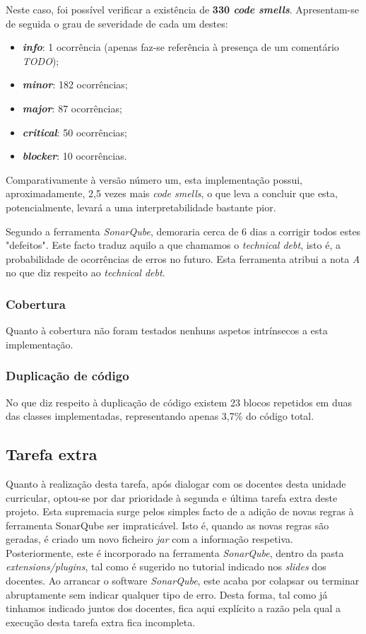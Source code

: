 \documentclass[a4paper]{report}
\begin{document}
Neste caso, foi possível verificar a existência de \textbf{330 \textit{code smells}}. Apresentam-se de seguida o grau de severidade de cada um destes:
\begin{itemize}
    \item \textbf{\textit{info}}: 1 ocorrência (apenas faz-se referência à presença de um comentário \textit{TODO});
    \item \textbf{\textit{minor}}: 182 ocorrências;
    \item \textbf{\textit{major}}: 87 ocorrências;
    \item \textbf{\textit{critical}}: 50 ocorrências;
    \item \textbf{\textit{blocker}}: 10 ocorrências.
\end{itemize}

Comparativamente à versão número um, esta implementação possui, aproximadamente, 2,5 vezes mais \textit{code smells}, o que leva a concluir que esta, potencialmente, levará a uma interpretabilidade bastante pior.

Segundo a ferramenta \textit{SonarQube}, demoraria cerca de 6 dias a corrigir todos estes "defeitos". Este facto traduz aquilo a que chamamos o \textit{technical debt}, isto é, a probabilidade de ocorrências de erros no futuro. Esta ferramenta atribui a nota \textit{A} no que diz respeito ao \textit{technical debt}.

\subsubsection{Cobertura}
Quanto à cobertura não foram testados nenhuns aspetos intrínsecos a esta implementação.

\subsubsection{Duplicação de código}
No que diz respeito à duplicação de código existem 23 blocos repetidos em duas das classes implementadas, representando apenas 3,7\% do código total.

\subsection{Tarefa extra}
Quanto à realização desta tarefa, após dialogar com os docentes desta unidade curricular, optou-se por dar prioridade à segunda e última tarefa extra deste projeto. 
Esta supremacia surge pelos simples facto de a adição de novas regras à ferramenta SonarQube ser impraticável. Isto é, quando as novas regras são geradas, é criado um novo ficheiro \textit{jar} com a informação respetiva. Posteriormente, este é incorporado na ferramenta \textit{SonarQube}, dentro da pasta \textit{extensions/plugins}, tal como é sugerido no tutorial indicado nos \textit{slides} dos docentes.
Ao arrancar o software \textit{SonarQube}, este acaba por colapsar ou terminar abruptamente sem indicar qualquer tipo de erro. Desta forma, tal como já tinhamos indicado juntos dos docentes, fica aqui explícito a razão pela qual a execução desta tarefa extra fica incompleta.
\end{document}
